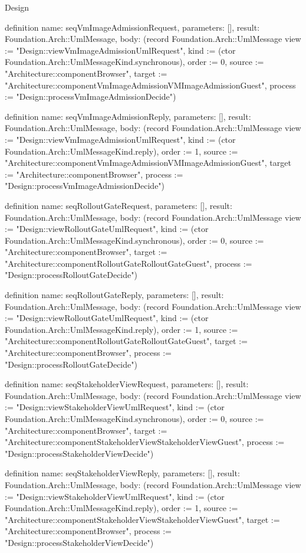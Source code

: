 \begin{lexlean}{Design}
\begin{semanticmodule}
definition{
  name: seqVmImageAdmissionRequest,
  parameters: [],
  result: Foundation.Arch::UmlMessage,
  body: (record Foundation.Arch::UmlMessage {view := "Design::viewVmImageAdmissionUmlRequest", kind := (ctor Foundation.Arch::UmlMessageKind.synchronous), order := 0, source := "Architecture::componentBrowser", target := "Architecture::componentVmImageAdmissionVMImageAdmissionGuest", process := "Design::processVmImageAdmissionDecide"})
}

definition{
  name: seqVmImageAdmissionReply,
  parameters: [],
  result: Foundation.Arch::UmlMessage,
  body: (record Foundation.Arch::UmlMessage {view := "Design::viewVmImageAdmissionUmlRequest", kind := (ctor Foundation.Arch::UmlMessageKind.reply), order := 1, source := "Architecture::componentVmImageAdmissionVMImageAdmissionGuest", target := "Architecture::componentBrowser", process := "Design::processVmImageAdmissionDecide"})
}

definition{
  name: seqRolloutGateRequest,
  parameters: [],
  result: Foundation.Arch::UmlMessage,
  body: (record Foundation.Arch::UmlMessage {view := "Design::viewRolloutGateUmlRequest", kind := (ctor Foundation.Arch::UmlMessageKind.synchronous), order := 0, source := "Architecture::componentBrowser", target := "Architecture::componentRolloutGateRolloutGateGuest", process := "Design::processRolloutGateDecide"})
}

definition{
  name: seqRolloutGateReply,
  parameters: [],
  result: Foundation.Arch::UmlMessage,
  body: (record Foundation.Arch::UmlMessage {view := "Design::viewRolloutGateUmlRequest", kind := (ctor Foundation.Arch::UmlMessageKind.reply), order := 1, source := "Architecture::componentRolloutGateRolloutGateGuest", target := "Architecture::componentBrowser", process := "Design::processRolloutGateDecide"})
}

definition{
  name: seqStakeholderViewRequest,
  parameters: [],
  result: Foundation.Arch::UmlMessage,
  body: (record Foundation.Arch::UmlMessage {view := "Design::viewStakeholderViewUmlRequest", kind := (ctor Foundation.Arch::UmlMessageKind.synchronous), order := 0, source := "Architecture::componentBrowser", target := "Architecture::componentStakeholderViewStakeholderViewGuest", process := "Design::processStakeholderViewDecide"})
}

definition{
  name: seqStakeholderViewReply,
  parameters: [],
  result: Foundation.Arch::UmlMessage,
  body: (record Foundation.Arch::UmlMessage {view := "Design::viewStakeholderViewUmlRequest", kind := (ctor Foundation.Arch::UmlMessageKind.reply), order := 1, source := "Architecture::componentStakeholderViewStakeholderViewGuest", target := "Architecture::componentBrowser", process := "Design::processStakeholderViewDecide"})
}


\end{semanticmodule}
\end{lexlean}
